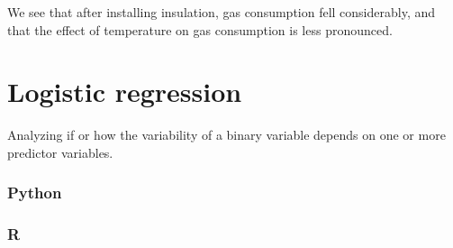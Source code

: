 \documentclass[
]{book}
\begin{document}
We see that after installing insulation, gas consumption fell considerably, and that the effect of temperature on gas consumption is less pronounced.

\hypertarget{logistic-regression}{%
\section{Logistic regression}\label{logistic-regression}}

Analyzing if or how the variability of a binary variable depends on one or more predictor variables.

\hypertarget{python-50}{%
\subsubsection*{Python}\label{python-50}}

\hypertarget{r-50}{%
\subsubsection*{R}\label{r-50}}

  
\end{document}
